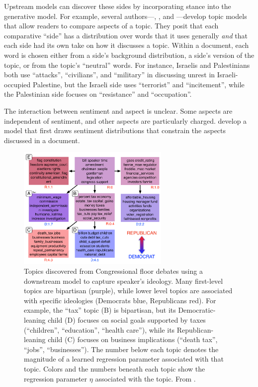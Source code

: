 Upstream models can discover these sides by incorporating stance into
the generative model.  For example, several authors---\citet{zhai-04},
\citet{lu-08}, and \citet{paul-10}---develop topic models that allow readers to compare
aspects of a topic.  They posit that each comparative
``side'' has a distribution over words that it uses generally
\emph{and} that each side had its own take on how it discusses a
topic.  Within a document, each word is chosen either from a side's
background distribution, a side's version of the topic, or from the
topic's ``neutral'' words.  For instance, Israelis and Palestinians
both use ``attacks'', ``civilians'', and ``military'' in discussing
unrest in Israeli-occupied Palestine, but the Israeli side uses
``terrorist'' and ``incitement'', while the Palestinian side focuses
on ``resistance'' and ``occupation''.

The interaction between sentiment and aspect is unclear.  Some
aspects are independent of sentiment, and other aspects are
particularly charged.  \citet{jo-11} develop a model that first draws
sentiment distributions that constrain the aspects discussed in a
document.


\begin{figure}[t]
\begin{center}
    \includegraphics[width=0.65\textwidth]{figures/ideology_topics_vert}
\end{center}
    \caption{
       \small Topics discovered from Congressional floor debates using
       a downstream model to capture speaker's ideology.  Many
    first-level topics are bipartisan (purple), while lower level topics are
    associated with specific ideologies (Democrats blue, Republicans red). For example,
    	the ``tax'' topic (B) is bipartisan, but its Democratic-leaning child (D) focuses on
    	social goals supported by taxes (``children'', ``education'', ``health care''), while
    	its Republican-leaning child (C) focuses on business implications (``death tax'', ``jobs'',
    	``businesses'').  The number below each
    topic denotes the magnitude of a learned regression parameter associated
    with that topic.  Colors and the numbers beneath each topic show the
    regression parameter $\eta$ associated with the topic.  From \citet{nguyen-13:shlda}.
    } \label{fig:shlda-taxes}
\end{figure}

